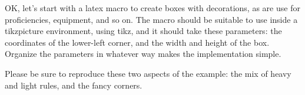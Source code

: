 






OK, let's start with a latex macro to create boxes with decorations, as are use for proficiencies, equipment, and so on.  The macro should be suitable to use inside a tikzpicture environment, using tikz, and it should take these parameters: the coordinates of the lower-left corner, and the width and height of the box.  Organize the parameters in whatever way makes the implementation simple.

Please be sure to reproduce these two aspects of the example: the mix of heavy and light rules, and the fancy corners.


